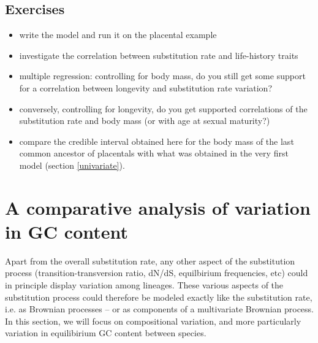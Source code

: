 \documentclass[usletter]{article}
\begin{document}
\subsection*{Exercises}

\begin{itemize}
\item
write the model and run it on the placental example
\item
investigate the correlation between substitution rate and life-history traits
\item
multiple regression: controlling for body mass, do you still get some support for a correlation between longevity and substitution rate variation?
\item
conversely, controlling for longevity, do you get supported correlations of the substitution rate and body mass (or with age at sexual maturity?)
\item
compare the credible interval obtained here for the body mass of the last common ancestor of placentals with what was obtained in the very first model (section \ref{univariate}).
\end{itemize}

\section{A comparative analysis of variation in GC content}

Apart from the overall substitution rate, any other aspect of the substitution process (transition-transversion ratio, dN/dS, equilbirium frequencies, etc) could in principle display variation among lineages. These various aspects of the substitution  process could therefore be modeled exactly like the substitution rate, i.e. as Brownian processes -- or as components of a multivariate Brownian process.
In this section, we will focus on compositional variation, and more particularly variation in equilibirium GC content between species.
\end{document}
